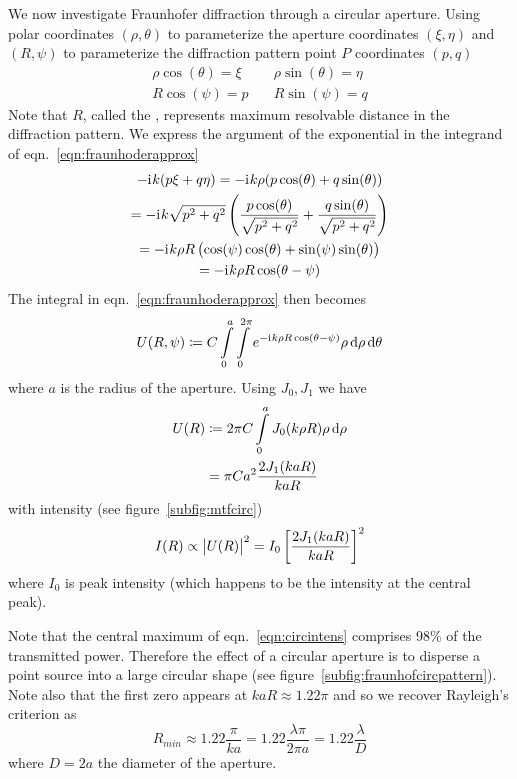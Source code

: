 We now investigate Fraunhofer diffraction through a circular aperture.
%
Using polar coordinates \((\rho, \theta)\) to parameterize the aperture coordinates \((\xi, \eta)\) and \((R, \psi)\) to parameterize the diffraction pattern point \(P\) coordinates \((p, q)\)
%
\begin{align}
    \rho \cos (\theta) = \xi &\quad \rho \sin(\theta) = \eta \\
    R \cos (\psi) = p &\quad R \sin(\psi) = q
\end{align}
%
Note that \(R\), called the , represents maximum resolvable distance in the diffraction pattern.
%
We express the argument of the exponential in the integrand of eqn.~\eqref{eqn:fraunhoderapprox}
%
\begin{multline}
    -\mathrm{i}\mkern1mu k (p \xi + q \eta) = -\mathrm{i}\mkern1mu k \rho (p \cos(\theta) + q \sin(\theta))  \\
    = -\mathrm{i}\mkern1mu k \sqrt{p^2 + q^2}\left( \frac{p \cos(\theta)}{\sqrt{p^2+q^2}} + \frac{q \sin(\theta)}{\sqrt{p^2+q^2}}   \right)  \\ 
    = -\mathrm{i}\mkern1mu k \rho R \left(\cos(\psi) \cos(\theta) + \sin(\psi)\sin(\theta) \right) \\
    = -\mathrm{i}\mkern1mu k \rho R \cos(\theta -\psi)
\end{multline}
%
The integral in eqn.~\eqref{eqn:fraunhoderapprox} then becomes 
%
\begin{equation}
    U(R, \psi) \coloneqq C \int\limits_{0}^a \int\limits_{0}^{2\pi} e^{-\iu k \rho R \cos(\theta - \psi)} \rho \dif \rho \dif \theta
\end{equation}
%
where \(a\) is the radius of the aperture.
%
Using  \(J_0, J_1\) we have 
%
\begin{align}
    U(R) &\coloneqq 2 \pi C \int\limits_0^a J_0(k \rho R) \rho \dif \rho \\ 
    & = \pi C a^2 \frac{2 J_1 (k a R)}{k a R}
\end{align}
%
with intensity (see figure~\ref{subfig:mtfcirc})
%
\begin{equation}
    I(R) \propto \abs{U(R)}^2 = I_0 \left[ \frac{2 J_1 (k a R)}{k a R} \right]^2\label{eqn:circintens}
\end{equation}
%
where \(I_0\) is peak intensity (which happens to be the intensity at the central peak).

Note that the central maximum of eqn.~\eqref{eqn:circintens} comprises 98\% of the transmitted power. 
%
Therefore the effect of a circular aperture is to disperse a point source into a large circular shape (see figure~\ref{subfig:fraunhofcircpattern}).
%
Note also that the first zero appears at \(k a R \approx 1.22\pi\) and so we recover Rayleigh's criterion as 
%
\begin{equation}
    R_{min} \approx 1.22 \frac{\pi}{k a} = 1.22 \frac{\lambda\pi}{2\pi a} = 1.22 \frac{\lambda}{D} 
\end{equation}
%
where \(D = 2a\) the diameter of the aperture.

